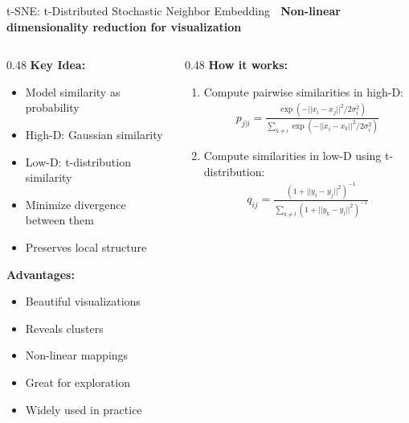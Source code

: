 \documentclass[aspectratio=169]{beamer}
\begin{document}
\begin{frame}[shrink=10]{t-SNE: t-Distributed Stochastic Neighbor Embedding 🎨}
\textbf{Non-linear dimensionality reduction for visualization}

\vspace{1em}

\begin{columns}[T]
\begin{column}{0.48\textwidth}
\textbf{Key Idea:}
\begin{itemize}\setlength{\itemsep}{0pt}
    \item Model similarity as probability
    \item High-D: Gaussian similarity
    \item Low-D: t-distribution similarity
    \item Minimize divergence between them
    \item Preserves \alert{local structure}
\end{itemize}

\vspace{0.5em}
\textbf{Advantages:}
\begin{itemize}\setlength{\itemsep}{0pt}
    \item Beautiful visualizations
    \item Reveals clusters
    \item Non-linear mappings
    \item Great for exploration
    \item Widely used in practice
\end{itemize}
\end{column}

\begin{column}{0.48\textwidth}
\textbf{How it works:}

\vspace{0.3em}
\begin{enumerate}\setlength{\itemsep}{0pt}
    \item Compute pairwise similarities in high-D:
    \begin{align*}
    p_{j|i} = \frac{\exp(-||x_i - x_j||^2 / 2\sigma_i^2)}{\sum_{k \neq i} \exp(-||x_i - x_k||^2 / 2\sigma_i^2)}
    \end{align*}

    \item Compute similarities in low-D using t-distribution:
    \begin{align*}
    q_{ij} = \frac{(1 + ||y_i - y_j||^2)^{-1}}{\sum_{k \neq l}(1 + ||y_k - y_l||^2)^{-1}}
    \end{align*}


\end{enumerate}
\end{column}
\end{columns}
\end{frame}
\end{document}

